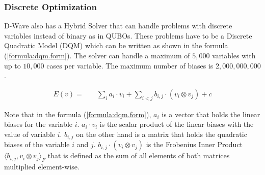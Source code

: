 \subsubsection{Discrete Optimization}

D-Wave also has a Hybrid Solver that can handle problems with discrete variables instead of binary as in QUBOs.
These problems have to be a Discrete Quadratic Model (DQM) which can be written as shown in the formula (\ref{formula:dqm.form}).
The solver can handle a maximum of $5, 000$ variables with up to $10, 000$ cases per variable.
The maximum number of biases is $2, 000, 000, 000$.
\cite{DQMHybrid2020}

\begin{align}
  \label{formula:dqm.form}
  E(v) =
  & \quad \sum_i a_i \cdot v_i + \sum_{i < j} b_{i, j} \cdot \left( v_i \otimes v_j \right) + c
\end{align}

Note that in the formula (\ref{formula:dqm.form}), $a_i$ is a vector that holds the linear biases for the variable $i$.
$a_i \cdot v_i$ is the scalar product of the linear biases with the value of variable $i$.
$b_{i, j}$ on the other hand is a matrix that holds the quadratic biases of the variable $i$ and $j$.
$b_{i, j} \cdot \left( v_i \otimes v_j \right)$ is the Frobenius Inner Product $\langle b_{i, j}, v_i \otimes v_j \rangle_F$ that is defined as the sum of all elements of both matrices multiplied element-wise.
